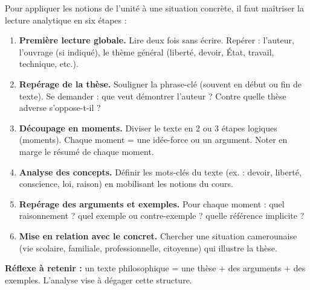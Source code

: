 \documentclass[11pt]{article}
\newcommand{\cle}[1]{{\popxbold\color{popdark}#1}}
\begin{document}
\begin{methode}
Pour appliquer les notions de l'unité à une situation concrète, il faut maîtriser la lecture analytique en six étapes :
\begin{enumerate}
\item \textbf{Première lecture globale.} Lire deux fois sans écrire. Repérer : l'auteur, l'ouvrage (si indiqué), le thème général (liberté, devoir, État, travail, technique, etc.).
\item \textbf{Repérage de la thèse.} Souligner la phrase-clé (souvent en début ou fin de texte). Se demander : que veut démontrer l'auteur ? Contre quelle thèse adverse s'oppose-t-il ?
\item \textbf{Découpage en moments.} Diviser le texte en 2 ou 3 étapes logiques (moments). Chaque moment = une idée-force ou un argument. Noter en marge le résumé de chaque moment.
\item \textbf{Analyse des concepts.} Définir les \cle{mots-clés} du texte (ex. : \cle{devoir}, \cle{liberté}, \cle{conscience}, \cle{loi}, \cle{raison}) en mobilisant les notions du cours.
\item \textbf{Repérage des arguments et exemples.} Pour chaque moment : quel raisonnement ? quel exemple ou contre-exemple ? quelle référence implicite ?
\item \textbf{Mise en relation avec le concret.} Chercher une situation camerounaise (vie scolaire, familiale, professionnelle, citoyenne) qui illustre la thèse.
\end{enumerate}
\textbf{Réflexe à retenir :} un texte philosophique = une \cle{thèse} + des \cle{arguments} + des \cle{exemples}. L'analyse vise à dégager cette structure.
\end{methode}
\end{document}
